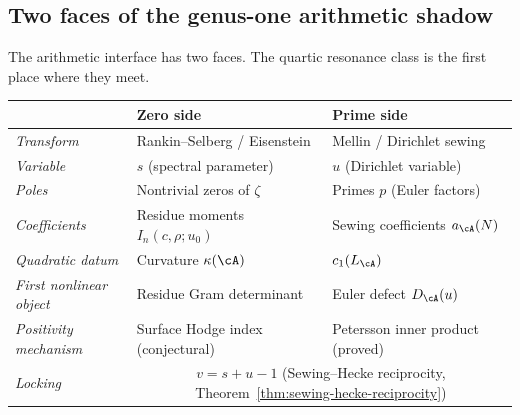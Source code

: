 \subsection{Two faces of the genus-one arithmetic shadow}%
\label{sec:arithmetic-synthesis}%

The arithmetic interface has two faces. The quartic
resonance class is the first place where they meet.

\begin{center}
\small
\renewcommand{\arraystretch}{1.3}
\begin{tabular}{lll}
\toprule
& \textbf{Zero side} & \textbf{Prime side} \\
\midrule
\emph{Transform}
 & Rankin--Selberg / Eisenstein
 & Mellin / Dirichlet sewing \\
\emph{Variable}
 & $s$ (spectral parameter)
 & $u$ (Dirichlet variable) \\
\emph{Poles}
 & Nontrivial zeros of $\zeta$
 & Primes $p$ (Euler factors) \\
\emph{Coefficients}
 & Residue moments $I_n(c,\rho;u_0)$
 & Sewing coefficients $a_\cA(N)$ \\
\emph{Quadratic datum}
 & Curvature $\kappa(\cA)$
 & $c_1(L_\cA)$ \\
\emph{First nonlinear object}
 & Residue Gram determinant
 & Euler defect $D_\cA(u)$ \\
\emph{Positivity mechanism}
 & Surface Hodge index (conjectural)
 & Petersson inner product (proved) \\
\emph{Locking}
 & \multicolumn{2}{c}{$v = s + u - 1$
 (Sewing--Hecke reciprocity,
 Theorem~\ref{thm:sewing-hecke-reciprocity})} \\
\bottomrule
\end{tabular}
\end{center}

